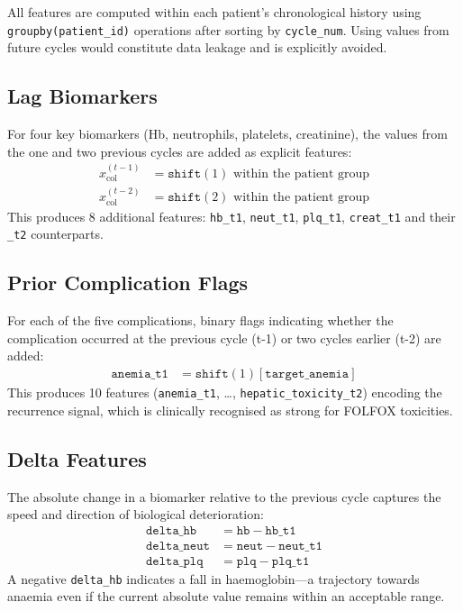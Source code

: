 \documentclass[12pt,a4paper]{report}
\begin{document}
All features are computed within each patient's chronological history using \texttt{groupby(\textquotesingle patient\_id\textquotesingle)} operations after sorting by \texttt{cycle\_num}. Using values from future cycles would constitute data leakage and is explicitly avoided.

\subsection{Lag Biomarkers}

For four key biomarkers (Hb, neutrophils, platelets, creatinine), the values from the one and two previous cycles are added as explicit features:
\begin{align}
  x^{(t-1)}_{\text{col}} &= \texttt{shift}(1) \text{ within the patient group} \\
  x^{(t-2)}_{\text{col}} &= \texttt{shift}(2) \text{ within the patient group}
\end{align}
This produces 8 additional features: \texttt{hb\_t1}, \texttt{neut\_t1}, \texttt{plq\_t1}, \texttt{creat\_t1} and their \texttt{\_t2} counterparts.

\subsection{Prior Complication Flags}

For each of the five complications, binary flags indicating whether the complication occurred at the previous cycle (t-1) or two cycles earlier (t-2) are added:
\begin{align}
  \texttt{anemia\_t1} &= \texttt{shift}(1)[\texttt{target\_anemia}]
\end{align}
This produces 10 features (\texttt{anemia\_t1}, \ldots, \texttt{hepatic\_toxicity\_t2}) encoding the recurrence signal, which is clinically recognised as strong for FOLFOX toxicities.

\subsection{Delta Features}

The absolute change in a biomarker relative to the previous cycle captures the speed and direction of biological deterioration:
\begin{align}
  \texttt{delta\_hb}   &= \texttt{hb}   - \texttt{hb\_t1} \\
  \texttt{delta\_neut} &= \texttt{neut} - \texttt{neut\_t1} \\
  \texttt{delta\_plq}  &= \texttt{plq}  - \texttt{plq\_t1}
\end{align}
A negative \texttt{delta\_hb} indicates a fall in haemoglobin---a trajectory towards anaemia even if the current absolute value remains within an acceptable range.
\end{document}
